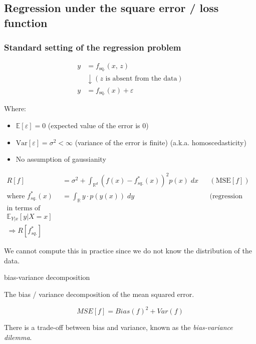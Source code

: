 \subsection{Regression under the square error / loss function}

\subsubsection{Standard setting of the regression problem}

\begin{align*}
	y & = f_\text{sq.}(x,\, z)                         \\
	  & \downarrow (z \text{ is absent from the data}) \\
	y & = f_\text{sq.}(x) + \varepsilon
\end{align*}

Where:
\begin{itemize}
	\item \(\mathds{E}[\varepsilon] = 0\) (expected value of the error is 0)
	\item \(\text{Var}[\varepsilon] = \sigma^2 < \infty\) (variance of the error is finite) (a.k.a. homoscedasticity)
	\item No assumption of gaussianity
\end{itemize}

\begin{prop}{}{}
	\begin{align*}
		R[f]                       & = \sigma^2 + \int_{\mathds{R}^d} (f(x) - f^*_{sq.}(x))^2 p(x)\; dx
		                           &                                                                    & (\text{MSE}[f])              \\
		\text{where } f^*_{sq.}(x) & = \int_{\mathds{R}} y\cdot p(y(x))\; dy
		                           &                                                                    & \text{(regression function)} \\
		\text{in terms of statistics: }                                                                                                \\ \mathds{E}_{Y|x}[y | X = x] \\
		\Rightarrow R[f^*_{sq.}]
	\end{align*}

	We cannot compute this in practice since we do not know the distribution
	of the data.
\end{prop}

\begin{prop}{bias-variance decomposition}{}

	The bias / variance decomposition of the mean squared error.

	\[MSE[f] = Bias(f)^2 + Var(f)
	\]

	There is a trade-off between bias and variance, known as the
	\emph{bias-variance dilemma}.
\end{prop}

